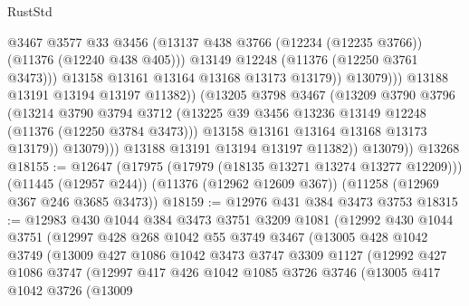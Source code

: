 \begin{lexlean}{RustStd}
\begin{coremodule}
{{{{{{{{{{{{{{{{{{{                                @3467
                                @3577
                                @33
                                @3456
                                (@13137
                                  @438
                                  @3766
                                  (@12234 (@12235 @3766))
                                  (@11376 (@12240 @438 @405)))
                                @13149
                                @12248
                                (@11376 (@12250 @3761 @3473)))
                              @13158
                              @13161
                              @13164
                              @13168
                              @13173
                              @13179))
                          @13079)))
                    @13188
                    @13191
                    @13194
                    @13197
                    @11382))
                (@13205
                  @3798
                  @3467
                  (@13209
                    @3790
                    @3796
                    (@13214
                      @3790
                      @3794
                      @3712
                      (@13225 @39 @3456 @13236 @13149 @12248 (@11376 (@12250 @3784 @3473)))
                      @13158
                      @13161
                      @13164
                      @13168
                      @13173
                      @13179))
                  @13079)))
            @13188
            @13191
            @13194
            @13197
            @11382))
        @13079))
    @13268
@18155 := @12647
    (@17975 (@17979 (@18135 @13271 @13274 @13277 @12209)))
    (@11445 (@12957 @244))
    (@11376 (@12962 @12609 @367))
    (@11258 (@12969 @367 @246 @3685 @3473))
@18159 := @12976 @431 @384 @3473 @3753
@18315 := @12983
    @430
    @1044
    @384
    @3473
    @3751
    @3209
    @1081
    (@12992
      @430
      @1044
      @3751
      (@12997
        @428
        @268
        @1042
        @55
        @3749
        @3467
        (@13005
          @428
          @1042
          @3749
          (@13009
            @427
            @1086
            @1042
            @3473
            @3747
            @3309
            @1127
            (@12992
              @427
              @1086
              @3747
              (@12997
                @417
                @426
                @1042
                @1085
                @3726
                @3746
                (@13005
                  @417
                  @1042
                  @3726
                  (@13009
}}}}}}}}}}}}}}}}}}}
\end{coremodule}
\end{lexlean}
